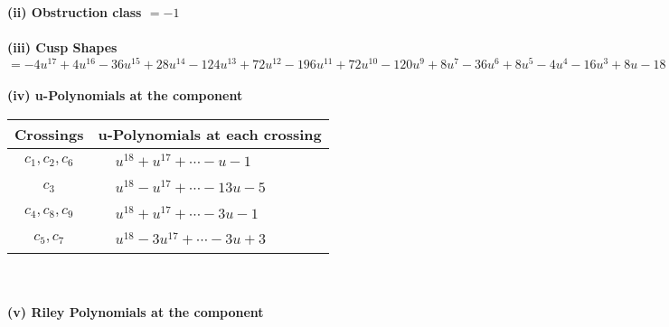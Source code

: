 \documentclass[1p]{elsarticle_modified}
\theoremstyle{definition}
\begin{document}
\flushleft \textbf{(ii) Obstruction class $= -1$}\\~\\
\flushleft \textbf{(iii) Cusp Shapes $= -4 u^{17}+4 u^{16}-36 u^{15}+28 u^{14}-124 u^{13}+72 u^{12}-196 u^{11}+72 u^{10}-120 u^9+8 u^7-36 u^6+8 u^5-4 u^4-16 u^3+8 u-18$}\\~\\
\newpage\renewcommand{\arraystretch}{1}
\flushleft \textbf{(iv) u-Polynomials at the component}\newline \\
\begin{tabular}{m{50pt}|m{274pt}}
Crossings & \hspace{64pt}u-Polynomials at each crossing \\
\hline $$\begin{aligned}c_{1},c_{2},c_{6}\end{aligned}$$&$\begin{aligned}
&u^{18}+u^{17}+\cdots- u-1
\end{aligned}$\\
\hline $$\begin{aligned}c_{3}\end{aligned}$$&$\begin{aligned}
&u^{18}- u^{17}+\cdots-13 u-5
\end{aligned}$\\
\hline $$\begin{aligned}c_{4},c_{8},c_{9}\end{aligned}$$&$\begin{aligned}
&u^{18}+u^{17}+\cdots-3 u-1
\end{aligned}$\\
\hline $$\begin{aligned}c_{5},c_{7}\end{aligned}$$&$\begin{aligned}
&u^{18}-3 u^{17}+\cdots-3 u+3
\end{aligned}$\\
\hline
\end{tabular}\\~\\
\newpage\renewcommand{\arraystretch}{1}
\flushleft \textbf{(v) Riley Polynomials at the component}\newline \\
\end{document}
